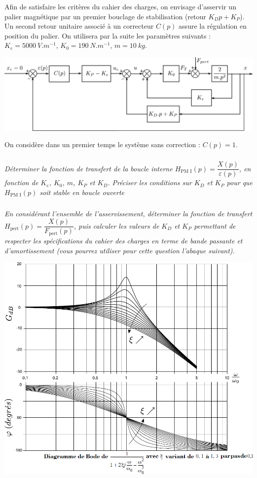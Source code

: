 \documentclass[10pt,fleqn]{article} %
\begin{document}
\begin{multicols}{2}
Afin de satisfaire les critères du cahier des charges, on envisage d'asservir un
palier magnétique par un premier bouclage de stabilisation (retour $K_D p+K_P$).
Un second retour unitaire associé à un correcteur $C(p)$ assure la régulation en
position du palier. On utilisera par la suite les
paramètres suivants : $K_e=\SI{5000}{V.m^{-1}}$, $K_0=\SI{190}{N.m^{-1}}$, $m=\SI{10}{kg}$.

\begin{center}
\includegraphics[width=\linewidth]{images/fig_02}
\end{center}

On considère dans un premier temps le système sans correction : $C(p)=1$.

\subparagraph{}\textit{Déterminer la fonction de transfert de la boucle interne $H_{\text{PM I}}(p) = \dfrac{X(p)}{\varepsilon(p)}$, en fonction de $K_e$, $K_0$, $m$, $K_P$ et $K_D$. Préciser les conditions
sur $K_D$ et $K_P$ pour que $H_{\text{PM I}}(p)$ soit stable en boucle ouverte}


\subparagraph{}\textit{En considérant l’ensemble de l’asservissement, déterminer la
fonction de transfert $H_{\text{pert}}(p) = \dfrac{X(p)}{F_{\text{pert}}(p)}$, puis calculer les valeurs de $K_D$ et $K_P$
permettant de respecter les spécifications du cahier des charges en terme de
bande passante et d’amortissement (vous pourrez utiliser pour cette question l’abaque suivant).}

\begin{center}
\includegraphics[width=\linewidth]{images/fig_03}
\end{center}



\end{multicols}
\end{document}
